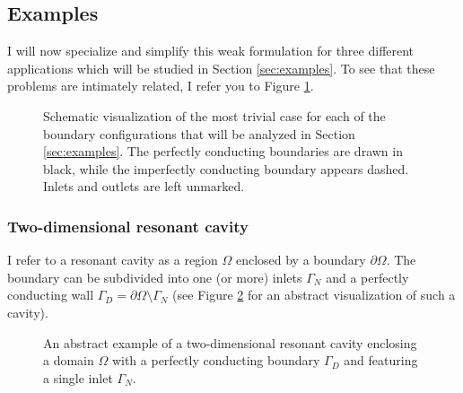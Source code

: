 \documentclass[11pt, a4paper]{article}
\begin{document}
\subsection{Examples}
\label{subsec:examples}

I will now specialize and simplify this weak formulation for three different
applications which will be studied in Section \ref{sec:examples}. To see
that these problems are intimately related, I refer you to Figure \ref{fig:examples}.

\begin{figure}[h]
    \centering
    
    \caption{Schematic visualization of the most trivial case for each of the
    boundary configurations that will be analyzed in Section \ref{sec:examples}.
    The perfectly conducting boundaries are drawn in black, while the imperfectly
    conducting boundary appears dashed. Inlets and outlets are left unmarked.}
    \label{fig:examples}
\end{figure}

\subsubsection{Two-dimensional resonant cavity}
\label{subsubsec:cavity}

I refer to a resonant cavity as a region $\Omega$ enclosed by a boundary $\partial \Omega$.
The boundary can be subdivided into one (or more) inlets $\Gamma_N$ and a perfectly
conducting wall $\Gamma_D = \partial \Omega \setminus \Gamma_N$
(see Figure \ref{fig:2d-cavity} for an abstract visualization of such a cavity).

\begin{figure}[h]
    \centering
    
    \caption{An abstract example of a two-dimensional resonant cavity enclosing
    a domain $\Omega$ with a perfectly conducting boundary $\Gamma_D$ and
    featuring a single inlet $\Gamma_N$.}
    \label{fig:2d-cavity}
\end{figure}
\end{document}
